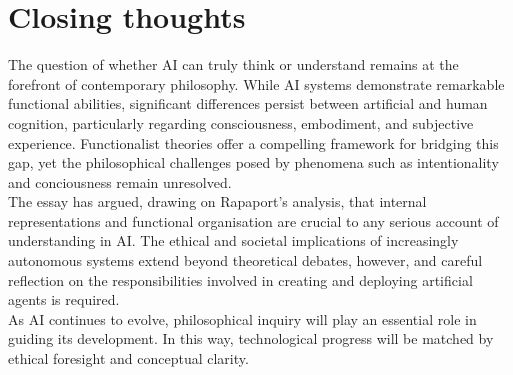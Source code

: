 \documentclass[runningheads]{llncs}
\begin{document}
\section{Closing thoughts}
The question of whether AI can truly think or understand remains at the forefront of contemporary philosophy. While AI systems demonstrate remarkable functional abilities, significant differences persist between artificial and human cognition, particularly regarding consciousness, embodiment, and subjective experience. Functionalist theories offer a compelling framework for bridging this gap, yet the philosophical challenges posed by phenomena such as intentionality and conciousness remain unresolved.
\\
The essay has argued, drawing on Rapaport's analysis, that internal representations and functional organisation are crucial to any serious account of understanding in AI. The ethical and societal implications of increasingly autonomous systems extend beyond theoretical debates, however, and careful reflection on the responsibilities involved in creating and deploying artificial agents is required.
\\
As AI continues to evolve, philosophical inquiry will play an essential role in guiding its development. In this way, technological progress will be matched by ethical foresight and conceptual clarity.
%
%

\end{document}
